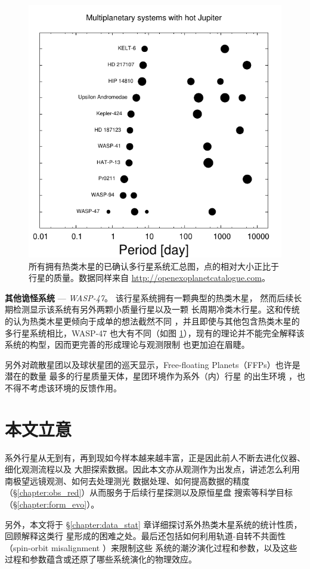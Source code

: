 \begin{figure}[b]
\centering
\includegraphics[width=1.0\textwidth]{figures/chapter1/fig14_hjmul.pdf}
\caption{所有拥有热类木星的已确认多行星系统汇总图，点的相对大小正比于行星的质量。数据同样来自 \url{http://openexoplanetcatalogue.com}。}
\label{fig:hjwcomp}
\end{figure}

\textbf{其他诡怪系统} --- \textit{WASP-47}。 {}  该行星系统拥有一颗典型的热类木星\cite{Hellier2012}，
然而后续长期检测显示该系统有另外两颗小质量行星\cite{Becker2015,SanchisOjeda2015}以及一颗
长周期冷类木行星\cite{NeveuVanMalle2016}。这和传统的认为热类木星更倾向于成单的想法截然不同
\cite{Steffen2012}，并且即使与其他包含热类木星的多行星系统相比，WASP-47 也大有不同（如图 
\ref{fig:hjwcomp}），现有的理论并不能完全解释该系统的构型，因而更完善的形成理论与观测限制
也更加迫在眉睫。

另外对疏散星团以及球状星团的巡天显示，Free-floating Planets（FFPs）也许是潜在的数量
最多的行星质量天体\cite{Lucas2000,Bihain2009,Sumi2011}，星团环境作为系外（内）行星
的出生环境\cite{Adams2010,Liu2013} ，也不得不考虑该环境的反馈作用。


\section{本文立意}

系外行星从无到有，再到现如今样本越来越丰富，正是因此前人不断去进化仪器、细化观测流程以及
大胆探索数据。因此本文亦从观测作为出发点，讲述怎么利用南极望远镜观测、如何去处理测光
数据处理、如何提高数据的精度（\S \ref{chapter:obs_red}）从而服务于后续行星探测以及原恒星盘
搜索等科学目标（\S \ref{chapter:form_evo}）。

另外，本文将于 \S \ref{chapter:data_stat} 章详细探讨系外热类木星系统的统计性质，回顾解释这类行
星形成的困难之处。最后还包括如何利用轨道-自转不共面性（spin-orbit misalignment ）来限制这些
系统的潮汐演化过程和参数，以及这些过程和参数蕴含或还原了哪些系统演化的物理效应。






